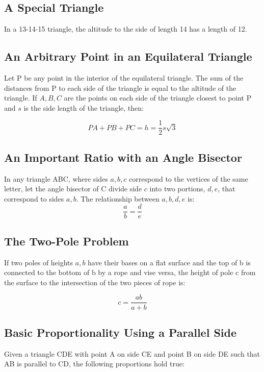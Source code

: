 \documentclass[final, letterpaper, 12pt]{article}
\begin{document}
	\subsection{A Special Triangle}\label{sec: special triangle situation}
		In a 13-14-15 triangle, the altitude to the side of length 14 has a length of 12.
	
	\subsection{An Arbitrary Point in an Equilateral Triangle}\label{sec: properties of a point inside an equilateral triangle}
		Let P be any point in the interior of the equilateral triangle. The sum of the distances from P to each side of the triangle is equal to the altitude of the triangle. If $A, B, C$ are the points on each side of the triangle closest to point P and $s$ is the side length of the triangle, then:
		
		\begin{equation}
			PA + PB + PC = h = \frac{1}{2}s\sqrt{3}
		\end{equation}
	
	\subsection{An Important Ratio with an Angle Bisector}\label{sec: a ratio concerning an angle bisector in a triangle}
		In any triangle ABC, where sides $a, b, c$ correspond to the vertices of the same letter, let the angle bisector of C divide side $c$ into two portions, $d, e$, that correspond to sides $a, b$. The relationship between $a, b, d, e$ is:
		\begin{equation}
			\frac{a}{b} = \frac{d}{e}
		\end{equation}
	
	\subsection{The Two-Pole Problem}\label{sec: two poles connected to the base of the other pole}
		If two poles of heights $a, b$ have their bases on a flat surface and the top of b is connected to the bottom of b by a rope and vise versa, the height of pole c from the surface to the intersection of the two pieces of rope is:
		
		\begin{equation}
			c = \frac{ab}{a+b}
		\end{equation}
	
	\subsection{Basic Proportionality Using a Parallel Side}\label{sec: proportionality with a parallel intersection in a triangle}
		Given a triangle CDE with point A on side CE and point B on side DE such that AB is parallel to CD, the following proportions hold true:
		
\end{document}
